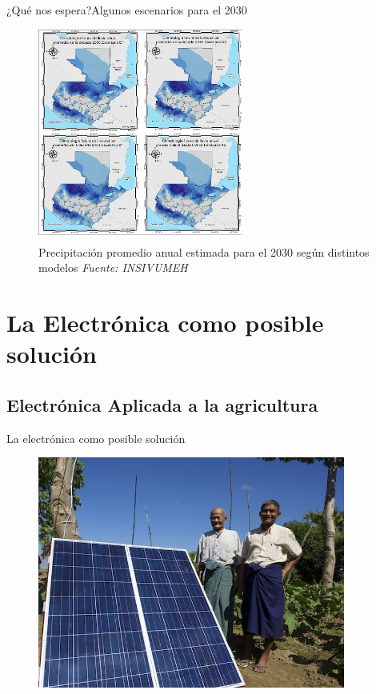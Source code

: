 \documentclass[]{beamer}
\begin{document}
\begin{frame}{¿Qué nos espera?}{Algunos escenarios para el 2030}
  \begin{figure}
     \includegraphics[width=0.6\textwidth]{Docs/Predictions}
    \caption{Precipitación promedio anual estimada para el 2030 según distintos modelos \emph{Fuente: INSIVUMEH}}
    \label{Fig:Lluvias2050}
  \end{figure}
\end{frame}

\section{La Electrónica como posible solución}
\subsection{Electrónica Aplicada a la agricultura}

\begin{frame}{La electrónica como posible solución}
  \begin{figure}
    \includegraphics[width=0.9\textwidth]{Docs/lotus-solar-pump}
  \end{figure}
\end{frame}
\end{document}
